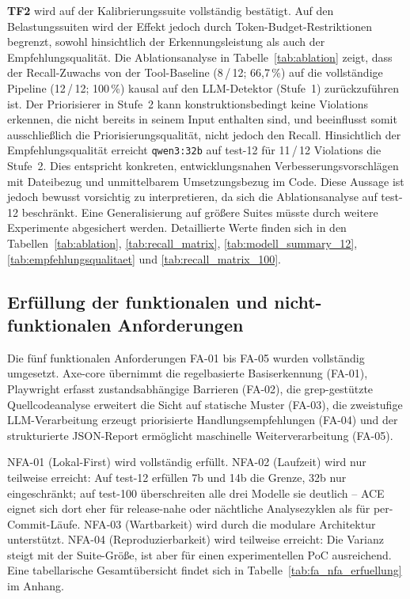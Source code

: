 \textbf{\acs{TF}2} wird auf der Kalibrierungssuite vollständig bestätigt. Auf den Belastungssuiten wird der Effekt jedoch durch Token-Budget-Restriktionen begrenzt, sowohl hinsichtlich der Erkennungsleistung als auch der Empfehlungsqualität. Die Ablationsanalyse in Tabelle~\ref{tab:ablation} zeigt, dass der Recall-Zuwachs von der Tool-Baseline (8\,/\,12; 66{,}7\,\%) auf die vollständige Pipeline (12\,/\,12; 100\,\%) kausal auf den \ac{LLM}-Detektor (Stufe~1) zurückzuführen ist. Der Priorisierer in Stufe~2 kann konstruktionsbedingt keine Violations erkennen, die nicht bereits in seinem Input enthalten sind, und beeinflusst somit ausschließlich die Priorisierungsqualität, nicht jedoch den Recall. Hinsichtlich der Empfehlungsqualität erreicht \texttt{qwen3:32b} auf test-12 für 11\,/\,12 Violations die Stufe~2. Dies entspricht konkreten, entwicklungsnahen Verbesserungsvorschlägen mit Dateibezug und unmittelbarem Umsetzungsbezug im Code. Diese Aussage ist jedoch bewusst vorsichtig zu interpretieren, da sich die Ablationsanalyse auf test-12 beschränkt. Eine Generalisierung auf größere Suites müsste durch weitere Experimente abgesichert werden. Detaillierte Werte finden sich in den Tabellen~\ref{tab:ablation}, \ref{tab:recall_matrix}, \ref{tab:modell_summary_12}, \ref{tab:empfehlungsqualitaet} und \ref{tab:recall_matrix_100}.

\subsection{Erfüllung der funktionalen und nicht-funktionalen Anforderungen}
\label{sec:fazit_anforderungen}

Die fünf funktionalen Anforderungen \ac{FA}-01 bis \ac{FA}-05 wurden vollständig umgesetzt. Axe-core übernimmt die regelbasierte Basiserkennung (\ac{FA}-01), Playwright erfasst zustandsabhängige Barrieren (\ac{FA}-02), die grep-gestützte Quellcodeanalyse erweitert die Sicht auf statische Muster (\ac{FA}-03), die zweistufige \ac{LLM}-Verarbeitung erzeugt priorisierte Handlungsempfehlungen (\ac{FA}-04) und der strukturierte \acs{JSON}-Report ermöglicht maschinelle Weiterverarbeitung (\ac{FA}-05).

\ac{NFA}-01 (Lokal-First) wird vollständig erfüllt. \ac{NFA}-02 (Laufzeit) wird nur teilweise erreicht: Auf test-12 erfüllen 7b und 14b die Grenze, 32b nur eingeschränkt; auf test-100 überschreiten alle drei Modelle sie deutlich -- \ac{ACE} eignet sich dort eher für release-nahe oder nächtliche Analysezyklen als für per-Commit-Läufe. \ac{NFA}-03 (Wartbarkeit) wird durch die modulare Architektur unterstützt. \ac{NFA}-04 (Reproduzierbarkeit) wird teilweise erreicht: Die Varianz steigt mit der Suite-Größe, ist aber für einen experimentellen \ac{PoC} ausreichend. Eine tabellarische Gesamtübersicht findet sich in Tabelle~\ref{tab:fa_nfa_erfuellung} im Anhang.

